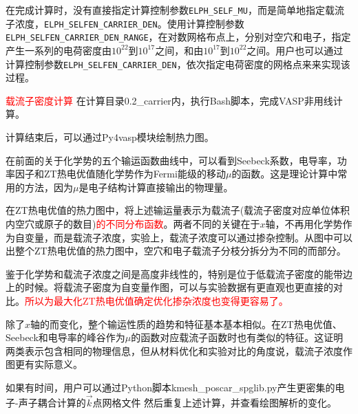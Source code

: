 在完成计算时，没有直接指定计算控制参数\texttt{ELPH\_SELF\_MU}，而是简单地指定载流子浓度，\texttt{ELPH\_SELFEN\_CARRIER\_DEN}。使用计算控制参数\texttt{ELPH\_SELFEN\_CARRIER\_DEN\_RANGE}，在对数网格布点上，分别对空穴和电子，指定产生一系列的电荷密度由$10^{22}$到$10^{17}$之间，和由$10^{17}$到$10^{22}$之间。用户也可以通过计算控制参数\texttt{ELPH\_SELFEN\_CARRIER\_DEN}，依次指定电荷密度的网格点来来实现该过程。

\textcolor{red}{载流子密度计算}
在计算目录\textrm{0.2\_carrier}内，执行\textrm{Bash}脚本，完成\textrm{VASP}非用线计算。

计算结束后，可以通过\textrm{Py4vasp}模块绘制热力图。

在前面的关于化学势的五个输运函数曲线中，可以看到\textrm{Seebeck}系数，电导率，功率因子和\textrm{ZT}热电优值随化学势作为\textrm{Fermi}能级的移动$\mu$的函数。这是理论计算中常用的方法，因为$\mu$是电子结构计算直接输出的物理量。

在\textrm{ZT}热电优值的热力图中，将上述输运量表示为载流子(载流子密度对应单位体积内空穴或原子的数目)\textcolor{red}{的不同分布函数}。两者不同的关键在于$x$轴，不再用化学势作为自变量，而是载流子浓度，实验上，载流子浓度可以通过掺杂控制。从图中可以出整个\textrm{ZT}热电优值的热力图中，空穴和电子载流子分枝分拆分为不同的而部分。

鉴于化学势和载流子浓度之间是高度非线性的，特别是位于低载流子密度的能带边上的时候。将载流子密度为自变量作图，可以与实验数据有更直观也更直接的对比。\textcolor{red}{所以为最大化\textrm{ZT}热电优值确定优化掺杂浓度也变得更容易了。}

除了$x$轴的而变化，整个输运性质的趋势和特征基本基本相似。在\textrm{ZT}热电优值、\textrm{Seebeck}和电导率的峰谷作为$\mu$的函数对应载流子函数时也有类似的特征。这证明两类表示包含相同的物理信息，但从材料优化和实验对比的角度说，载流子浓度作图更有实际意义。

如果有时间，用户可以通过\textrm{Python}脚本\textrm{kmesh\_poscar\_spglib.py}产生更密集的电子-声子耦合计算的$\vec k$点网格文件
然后重复上述计算，并查看绘图解析的变化。

